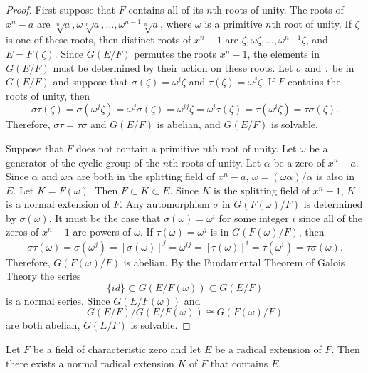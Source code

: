 
\begin{proof}
First suppose that $F$ contains all of its $n$th roots of unity.
The roots of $x^n - a$ are $\sqrt[n]{a}, \omega	\sqrt[n]{a}, \ldots,
\omega^{n-1} \sqrt[n]{a}$, where $\omega$ is a primitive $n$th root of
unity. If $\zeta$ is one of these roots, then distinct roots of $x^n
- 1$ are $\zeta, \omega \zeta, \ldots, \omega^{n-1} \zeta$, and $E =
F(\zeta)$. Since $G(E/F)$ permutes the roots $x^n - 1$, the elements in 
$G(E/F)$ must be determined by their action on these roots. Let $\sigma$ 
and $\tau$ be in $G(E/F)$ and suppose that $\sigma( \zeta ) = \omega^i 
\zeta$ and $\tau( \zeta ) = \omega^j \zeta$. If $F$ contains the
roots of unity, then 
\[
\sigma \tau( \zeta ) = \sigma( \omega^j \zeta) = \omega^j \sigma(
\zeta ) = \omega^{ij} \zeta = \omega^i \tau( \zeta ) = \tau( \omega^i
\zeta ) = \tau \sigma( \zeta ). 
\]
Therefore, $\sigma \tau = \tau \sigma$ and $G(E/F)$ is abelian, and
$G(E/F)$ is solvable. 
 
 
Suppose that $F$ does not contain a primitive $n$th root of unity.
Let $\omega$ be a generator of the cyclic group of the $n$th roots
of unity.  Let $\alpha$ be a zero of $x^n - a$. Since $\alpha$ and
$\omega \alpha$ are both in the splitting field of $x^n - a$, $\omega
= (\omega \alpha)/ \alpha$ is also in $E$. Let $K = F( \omega)$. Then
$F \subset K \subset E$. Since $K$ is the splitting field of $x^n -
1$, $K$ is a normal extension of $F$. Any automorphism $\sigma$ in
$G(F( \omega)/ F)$ is determined by $\sigma( \omega)$.  It must be
the case that $\sigma( \omega ) = \omega^i$ for some integer $i$ since
all of the zeros of $x^n-1$ are powers of $\omega$. If $\tau( \omega
) = \omega^j$ is in $G(F(\omega)/F)$, then
\[
\sigma \tau( \omega ) = \sigma( \omega^j ) = [ \sigma(
\omega )]^j = \omega^{ij} = [\tau( \omega ) ]^i = \tau( \omega^i ) 
= \tau \sigma( \omega ). 
\]
Therefore, $G(F( \omega ) / F)$ is abelian.  By the Fundamental
Theorem of Galois Theory the series 
\[
\{ id \} \subset G(E/ F(\omega)) \subset G(E/F)
\]
is a normal series. Since $G(E/F(\omega))$ and 
\[
G(E/F) /G(E/F( \omega)) \cong G(F(\omega)/F)
\]
are both abelian, $G(E/F)$ is solvable.
\end{proof}
 
 
 
 
\begin{lemma}\label{galois:radical_extension_lemma}
Let $F$ be a field of characteristic zero and let $E$ be a radical
extension of $F$. Then there exists a normal radical extension $K$ of
$F$ that contains $E$.
\end{lemma}
 
